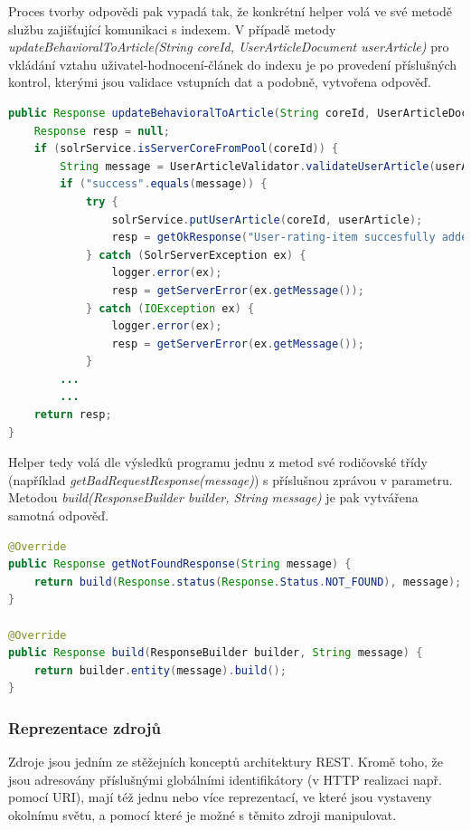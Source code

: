 \documentclass[thesis=M,czech]{FITthesis}[2014/05/07]
\begin{document}
Proces tvorby odpovědi pak vypadá tak, že konkrétní helper volá ve své metodě službu zajišťující komunikaci s indexem. V případě metody \emph{updateBehavioralToArticle(String coreId, UserArticleDocument userArticle)} pro vkládání vztahu uživatel-hodnocení-článek do indexu je po provedení příslušných kontrol, kterými jsou validace vstupních dat a podobně, vytvořena odpověď.

\begin{lstlisting}[language=java]
public Response updateBehavioralToArticle(String coreId, UserArticleDocument userArticle) {
    Response resp = null;
    if (solrService.isServerCoreFromPool(coreId)) {
        String message = UserArticleValidator.validateUserArticle(userArticle);
        if ("success".equals(message)) {
            try {
                solrService.putUserArticle(coreId, userArticle);
                resp = getOkResponse("User-rating-item succesfully added into Solr core.");
            } catch (SolrServerException ex) {
                logger.error(ex);
                resp = getServerError(ex.getMessage());
            } catch (IOException ex) {
                logger.error(ex);
                resp = getServerError(ex.getMessage());
            }
		...
		...
    return resp;
}
\end{lstlisting}

Helper tedy volá dle výsledků programu jednu z metod své rodičovské třídy (například \emph{getBadRequestResponse(message)}) s příslušnou zprávou v parametru. Metodou \emph{build(ResponseBuilder builder, String message)} je pak vytvářena samotná odpověď.

\begin{lstlisting}[language=java]
@Override
public Response getNotFoundResponse(String message) {
    return build(Response.status(Response.Status.NOT_FOUND), message);
}    

@Override
public Response build(ResponseBuilder builder, String message) {
    return builder.entity(message).build();
}
\end{lstlisting}

\subsubsection{Reprezentace zdrojů}
\label{subsub:resource}
Zdroje jsou jedním ze stěžejních konceptů architektury REST. Kromě toho, že jsou adresovány příslušnými globálními identifikátory (v HTTP realizaci např. pomocí URI), mají též jednu nebo více reprezentací, ve které jsou vystaveny okolnímu světu, a pomocí které je možné s těmito zdroji manipulovat. 
\end{document}
